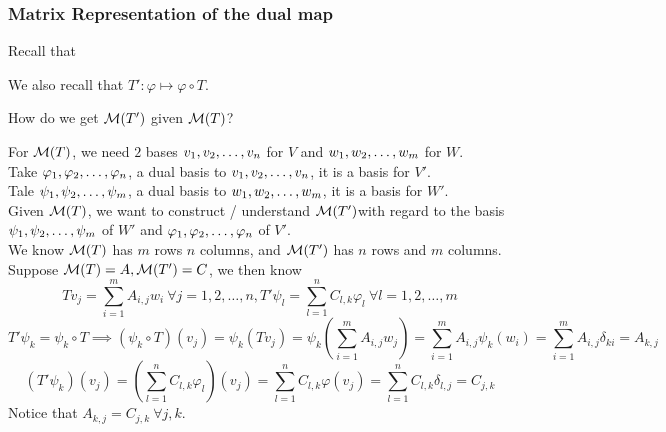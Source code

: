 \subsubsection{Matrix Representation of the dual map}
Recall that
\begin{center}
\end{center}
\begin{center}
\end{center}
We also recall that $T' : \varphi \mapsto \varphi \circ T$.
\newpage
\begin{question}
    How do we get $\mathcal M(T')$ given $\mathcal M(T)$?
\end{question}
\begin{answer}
For $\mathcal M(T)$, we need $2$ bases ${v}_1,{v}_2, \ldots, {v}_{n}$ for $V$ and ${w}_1,{w}_2, \ldots, {w}_{m}$ for $W$. \\
    Take ${\varphi}_1,{\varphi}_2, \ldots, {\varphi}_{n}$, a dual basis to ${v}_1,{v}_2, \ldots, {v}_{n}$, it is a basis for $V'$. \\
    Tale ${\psi}_1,{\psi}_2, \ldots, {\psi}_{m}$, a dual basis to ${w}_1,{w}_2, \ldots, {w}_{m}$, it is a basis for $W'$. \\
    Given $\mathcal M(T)$, we want to construct / understand $\mathcal M(T')$with regard to the basis ${\psi}_1,{\psi}_2, \ldots, {\psi}_{m}$ of $W'$ and ${\varphi}_1,{\varphi}_2, \ldots, {\varphi}_{n}$ of $V'$. \\
    We know $\mathcal M(T)$ has $m$ rows $n$ columns, and $\mathcal M(T')$ has $n$ rows and $m$ columns. \\Suppose $\mathcal M(T) = A, \mathcal M(T') = C$, we then know 
    \[ Tv_j = \sum_{i = 1}^m A_{i,j} w_i \ \forall j = 1,2, \ldots, n, T'\psi_l = \sum_{l = 1}^n C_{l,k} \varphi_{l} \ \forall l =  1,2,\ldots, m\]
    \[ T' \psi_k = \psi_k \circ T \implies (\psi_k \circ T )(v_j) = \psi_k(Tv_j) = \psi_k \left( \sum_{i=1}^m A_{i,j} w_j \right) = \sum_{i = 1}^m A_{i,j} \psi_k(w_i) = \sum_{i = 1}^m A_{i,j} \delta_{ki} = A_{k,j}\]
    \[(T'\psi_k)(v_j) = \left( \sum_{l = 1}^{n} C_{l,k} \varphi_l \right) (v_j) = \sum_{l = 1}^{n} C_{l,k} \varphi(v_j) = \sum_{l = 1}^{n} C_{l,k} \delta_{l,j} = C_{j,k} \]
    Notice that $A_{k,j} = C_{j,k} \ \forall j,k$.
\end{answer}
